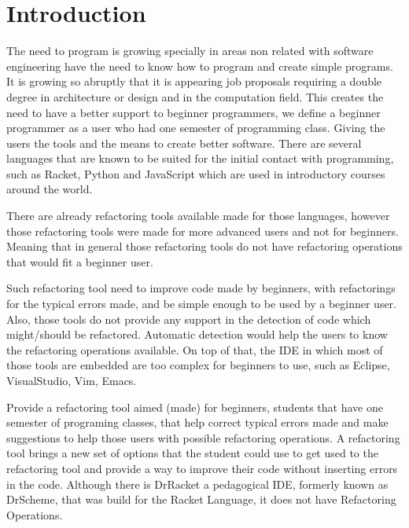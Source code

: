 \section{Introduction}



The need to program is growing specially in areas non related with software engineering %
have the need to know how to program and create simple programs.
It is growing so abruptly that it is appearing job proposals requiring a double degree in
architecture or design and in the computation field. %
This creates the need to have a better support to beginner programmers, we define
a beginner programmer as a user who had one semester of programming class. %
Giving the users the tools and the means to create better software.
There are several languages that are known to be suited for the initial contact
with programming, such as Racket, Python and JavaScript which are used in introductory
courses around the world.

There are already refactoring tools available made for those languages, %
however those refactoring tools were made for more advanced users and not for beginners.
Meaning that in general those refactoring tools do not have refactoring operations that %
would fit a beginner user.

Such refactoring tool need to improve code made by beginners, with refactorings for
the typical errors made, and be simple enough to be used by a beginner user.
Also, those tools do not provide any support in the detection of code which might/should
be refactored.
Automatic detection would help the users to know the refactoring operations available.
On top of that, the IDE in which most of those tools are embedded are too complex for beginners
to use, such as Eclipse, VisualStudio, Vim, Emacs. %

Provide a refactoring tool aimed (made) for beginners, students that have one semester
of programing classes, that help correct typical errors made and make suggestions
to help those users with possible refactoring operations.
A refactoring tool brings a new set of options that the student could use to
get used to the refactoring tool and provide a way to improve their code without
inserting errors in the code.
Although there is DrRacket a pedagogical IDE, formerly known as DrScheme, that was
build for the Racket Language, it does not have Refactoring Operations.

